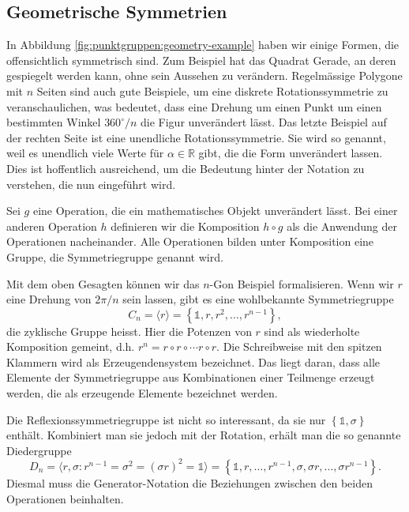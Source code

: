 \subsection{Geometrische Symmetrien}

In Abbildung \ref{fig:punktgruppen:geometry-example} haben wir einige Formen,
die offensichtlich symmetrisch sind.  Zum Beispiel hat das Quadrat Gerade, an
deren gespiegelt werden kann, ohne sein Aussehen zu verändern.  Regelmässige
Polygone mit \(n\) Seiten sind auch gute Beispiele, um eine diskrete
Rotationssymmetrie zu veranschaulichen, was bedeutet, dass eine Drehung um
einen Punkt um einen bestimmten Winkel \(360^\circ/n\) die Figur unverändert
lässt.  Das letzte Beispiel auf der rechten Seite ist eine unendliche
Rotationssymmetrie. Sie wird so genannt, weil es unendlich viele Werte für
\(\alpha \in \mathbb{R}\) gibt, die die Form unverändert lassen.  Dies ist
hoffentlich ausreichend, um die Bedeutung hinter der Notation zu verstehen, die
nun eingeführt wird.

\begin{definition}[Symmetriegruppe]
	Sei \(g\) eine Operation, die ein mathematisches Objekt unverändert lässt.
	Bei einer anderen Operation \(h\) definieren wir die Komposition \(h\circ g\)
	als die Anwendung der Operationen nacheinander. Alle Operationen bilden unter
	Komposition eine Gruppe, die Symmetriegruppe genannt wird.
\end{definition}

Mit dem oben Gesagten können wir das \(n\)-Gon Beispiel formalisieren. Wenn wir
\(r\) eine Drehung von \(2\pi/n\) sein lassen, gibt es eine wohlbekannte Symmetriegruppe
\[
	C_n = \langle r \rangle
		= \left\{\mathds{1}, r, r^2, \ldots, r^{n-1}\right\},
\]
die zyklische Gruppe heisst. Hier die Potenzen von \(r\) sind als wiederholte
Komposition gemeint, d.h. \(r^n = r\circ r \circ \cdots r\circ r\).  Die
Schreibweise mit den spitzen Klammern wird als Erzeugendensystem bezeichnet.
Das liegt daran, dass alle Elemente der Symmetriegruppe aus Kombinationen einer
Teilmenge erzeugt werden, die als erzeugende Elemente bezeichnet werden. 


Die Reflexionssymmetriegruppe ist nicht so interessant, da sie nur
\(\left\{\mathds{1}, \sigma\right\}\) enthält. Kombiniert man sie jedoch mit
der Rotation, erhält man die so genannte Diedergruppe
\[
	D_n = \langle r, \sigma : r^{n-1} = \sigma^2 = (\sigma r)^2 = \mathds{1} \rangle
		= \left\{
				\mathds{1}, r, \ldots, r^{n-1}, \sigma, \sigma r, \ldots, \sigma r^{n-1}
		\right\}.
\]
Diesmal muss die Generator-Notation die Beziehungen zwischen den beiden
Operationen beinhalten. 

